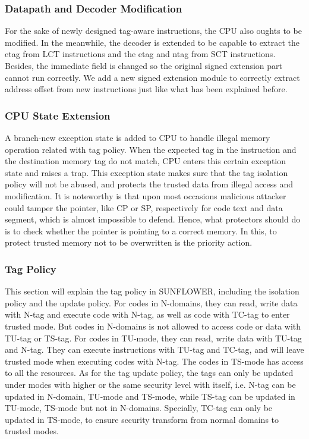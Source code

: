 \documentclass[conference]{IEEEtran}
\begin{document}
\subsubsection{Datapath and Decoder Modification}
For the sake of newly designed tag-aware instructions, the CPU also oughts to be modified. In the meanwhile, the decoder is extended to be capable to extract the etag from LCT instructions and the etag and ntag from SCT instructions. Besides, the immediate field is changed so the original signed extension part cannot run correctly. We add a new signed extension module to correctly extract address offset from new instructions just like what has been explained before.

\subsubsection{CPU State Extension}
A branch-new exception state is added to CPU to handle illegal memory operation related with tag policy. When the expected tag in the instruction and the destination memory tag do not match, CPU enters this certain exception state and raises a trap. This exception state makes sure that the tag isolation policy will not be abused, and protects the trusted data from illegal access and modification. It is noteworthy is that upon most occasions malicious attacker could tamper the pointer, like CP or SP, respectively for code text and data segment, which is almost impossible to defend. Hence, what protectors should do is to check whether the pointer is pointing to a correct memory. In this, to protect trusted memory not to be overwritten is the priority action. 

\subsubsection{Tag Policy}
This section will explain the tag policy in SUNFLOWER, including the isolation policy and the update policy. For codes in N-domains, they can read, write data with N-tag and execute code with N-tag, as well as code with TC-tag to enter trusted mode. But codes in N-domains is not allowed to access code or data with TU-tag or TS-tag. For codes in TU-mode, they can read, write data with TU-tag and N-tag. They can execute instructions with TU-tag and TC-tag, and will leave trusted mode when executing codes with N-tag. The codes in TS-mode has access to all the resources. As for the tag update policy, the tags can only be updated under modes with higher or the same security level with itself, i.e. N-tag can be updated in N-domain, TU-mode and TS-mode, while TS-tag can be updated in TU-mode, TS-mode but not in N-domains. Specially, TC-tag can only be updated in TS-mode, to ensure security transform from normal domains to trusted modes. 
\end{document}

